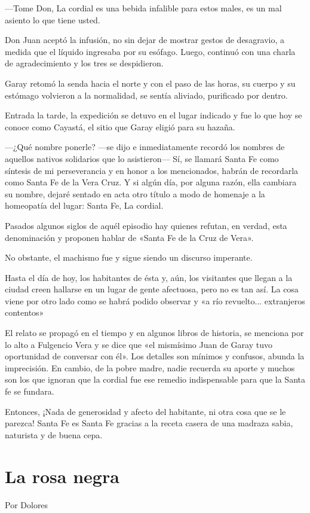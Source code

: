 \documentclass[11pt,twoside,openright,a5paper]{book}
\begin{document}
---Tome Don, La cordial es una bebida infalible para estos males, es un mal asiento lo que tiene usted.

Don Juan aceptó la infusión, no sin dejar de mostrar gestos de desagravio, a medida que el líquido ingresaba por su esófago. Luego, continuó con una charla de agradecimiento y los tres se despidieron. 

Garay retomó la senda hacia el norte y con el paso de las horas, su cuerpo y su estómago volvieron a la normalidad, se sentía aliviado, purificado por dentro.

Entrada la tarde, la expedición se detuvo en el lugar indicado y fue lo que hoy se conoce como Cayastá, el sitio que Garay eligió para su hazaña.

---¿Qué nombre ponerle? ---se dijo e inmediatamente recordó los nombres de aquellos nativos solidarios que lo asistieron--- Sí, se llamará Santa Fe como síntesis de mi perseverancia y en honor a los mencionados, habrán de recordarla como Santa Fe de la Vera Cruz. Y si algún día, por alguna razón, ella cambiara su nombre, dejaré sentado en acta otro título a modo de homenaje a la homeopatía del lugar: Santa Fe, La cordial.

Pasados algunos siglos de aquél episodio hay quienes refutan, en verdad, esta denominación y proponen hablar de «Santa Fe de la Cruz de Vera».

No obstante, el machismo fue y sigue siendo un discurso imperante.

Hasta el día de hoy, los habitantes de ésta y, aún, los visitantes que llegan a la ciudad creen hallarse en un lugar de gente afectuosa, pero no es tan así. La cosa viene por otro lado como se habrá podido observar y «a río revuelto... extranjeros contentos»

El relato se propagó en el tiempo y en algunos libros de historia, se menciona por lo alto a Fulgencio Vera y se dice que «el mismísimo Juan de Garay tuvo oportunidad de conversar con él». Los detalles son mínimos y confusos, abunda la imprecisión. En cambio, de la pobre madre, nadie recuerda su aporte y muchos son los que ignoran que la cordial fue ese remedio indispensable para que la Santa fe se fundara. 

Entonces, ¡Nada de generosidad y afecto del habitante, ni otra cosa que se le parezca! Santa Fe es Santa Fe gracias a la receta casera de una madraza sabia, naturista y de buena cepa.

\section*{La rosa negra}
                                                                                                   \begin{flushright}Por Dolores\end{flushright}
\end{document}
